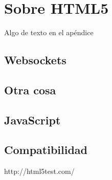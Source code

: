 \chapter{Sobre HTML5}

Algo de texto en el apéndice


\section{Websockets}


\section{Otra cosa}


\section{JavaScript}



\section{Compatibilidad}

http://html5test.com/





